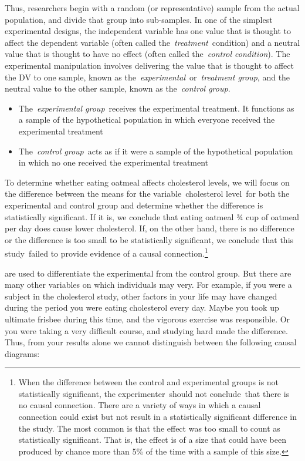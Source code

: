 \begin{refsection}
Thus, researchers begin with a random (or representative) sample from the actual population, and divide that group into sub-samples. In one of the simplest experimental designs, the independent variable has one value that is thought to affect the dependent variable (often called the \emph{treatment} condition) and a neutral value that is thought to have no effect (often called the \emph{control condition}). The experimental manipulation involves delivering the value that is thought to affect the DV to one sample, known as the \emph{experimental} or \emph{treatment group}, and the neutral value to the other sample, known as the \emph{control group}.

\begin{itemize}
\item The \emph{experimental group} receives the experimental treatment. It functions as a sample of the hypothetical population in which everyone received the experimental treatment

\item The \emph{control group} acts as if it were a sample of the hypothetical population in which no one received the experimental treatment

\end{itemize}

To determine whether eating oatmeal affects cholesterol levels, we will focus on the difference between the means for the variable cholesterol level for both the experimental and control group and determine whether the difference is statistically significant. If it is, we conclude that eating oatmeal ¾ cup of oatmeal per day does cause lower cholesterol. If, on the other hand, there is no difference or the difference is too small to be statistically significant, we conclude that this study failed to provide evidence of a causal connection.\footnote{When the difference between the control and experimental groups is not statistically significant, the experimenter should not conclude that there is no causal connection. There are a variety of ways in which a causal connection could exist but not result in a statistically significant difference in the study. The most common is that the effect was too small to count as statistically significant. That is, the effect is of a size that could have been produced by chance more than 5\% of the time with a sample of this size.}

 are used to differentiate the experimental from the control group. But there are many other variables on which individuals may very. For example, if you were a subject in the cholesterol study, other factors in your life may have changed during the period you were eating cholesterol every day.
Maybe you took up ultimate frisbee during this time, and the vigorous exercise was responsible. Or you were taking a very difficult course, and studying hard made the difference. Thus, from your results alone we cannot distinguish between the following causal diagrams:


\end{refsection}

